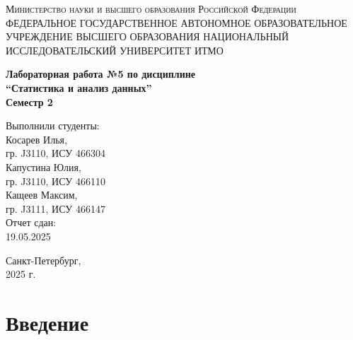 \documentclass[a4paper, 12pt]{report}
\begin{document}
\begin{titlepage}
    \begin{center}
    \textsc{Министерство науки и высшего образования Российской Федерации \\
    ФЕДЕРАЛЬНОЕ ГОСУДАРСТВЕННОЕ АВТОНОМНОЕ ОБРАЗОВАТЕЛЬНОЕ УЧРЕЖДЕНИЕ ВЫСШЕГО ОБРАЗОВАНИЯ НАЦИОНАЛЬНЫЙ ИССЛЕДОВАТЕЛЬСКИЙ УНИВЕРСИТЕТ ИТМО \\[5mm]
    }

    \vfill
    \vfill

    \textbf{
    \Large{Лабораторная работа №5
    по дисциплине} \\
    \Large{“Статистика и анализ данных” }
    \\[6mm]
    Семестр 2
    \\[20mm]
    }
    \end{center}

    \hfill
    \begin{minipage}{.5\textwidth}
    \begin{flushright}
    Выполнили студенты:\\[2mm] 
    Косарев Илья, \\
    гр. J3110, ИСУ 466304\\[2mm]

    Капустина Юлия, \\
    гр. J3110, ИСУ 466110\\[2mm]

    Кащеев Максим,\\
    гр. J3111, ИСУ 466147\\[3mm]
    Отчет сдан: \\
    19.05.2025


    \end{flushright}
    \end{minipage}%
    \vfill
    \begin{center}
    Санкт-Петербург,\\
    2025 г.
    \end{center}
\end{titlepage}

\tableofcontents
\newpage

\chapter*{Введение}
\setcounter{chapter}{1}
\setcounter{section}{0}
\end{document}

